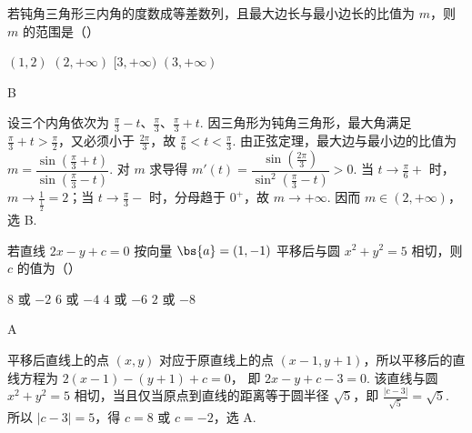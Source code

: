 \begin{problem}
若钝角三角形三内角的度数成等差数列，且最大边长与最小边长的比值为 \(m\)，则 \(m\) 的范围是（\quad）

\choices
    {\((1,2)\)}
    {\((2, +\infty)\)}
    {\([3, +\infty)\)}
    {\((3, +\infty)\)}

\begin{answer}
B
\end{answer}

\begin{solution}
设三个内角依次为 \(\frac\pi3-t\)、\(\frac\pi3\)、\(\frac\pi3+t\). 因三角形为钝角三角形，最大角满足 \(\frac\pi3+t>\frac\pi2\)，又必须小于 \(\frac{2\pi}3\)，故
\(\frac\pi6<t<\frac\pi3\).
由正弦定理，最大边与最小边的比值为
\(m=\dfrac{\sin(\frac\pi3+t)}{\sin(\frac\pi3-t)}\).
对 \(m\) 求导得
\(m'(t)=\dfrac{\sin\left(\frac{2\pi}{3}\right)}{\sin^2\left(\frac\pi3-t\right)}>0\).
当 \(t\to\frac\pi6+\) 时，\(m\to\frac1{\frac{1}{2}}=2\)；当 \(t\to\frac\pi3-\) 时，分母趋于 \(0^+\)，故 \(m\to+\infty\). 因而 \(m\in(2,+\infty)\)，选 B.
\end{solution}
\end{problem}

\begin{problem}
若直线 \(2x - y + c = 0\) 按向量 \(\bs{a} = (1, -1)\) 平移后与圆 \(x^{2} + y^{2} = 5\) 相切，则 \(c\) 的值为（\quad）

\choices
    {\(8\) 或 \(-2\)}
    {\(6\) 或 \(-4\)}
    {\(4\) 或 \(-6\)}
    {\(2\) 或 \(-8\)}

\begin{answer}
A
\end{answer}

\begin{solution}
平移后直线上的点 \((x,y)\) 对应于原直线上的点 \((x-1,y+1)\)，所以平移后的直线方程为
\(2(x-1)-(y+1)+c=0\)，
即 \(2x-y+c-3=0\). 该直线与圆 \(x^2+y^2=5\) 相切，当且仅当原点到直线的距离等于圆半径 \(\sqrt5\)，即
\(\frac{|c-3|}{\sqrt5}=\sqrt5\).
所以 \(|c-3|=5\)，得 \(c=8\) 或 \(c=-2\)，选 A.
\end{solution}
\end{problem}


